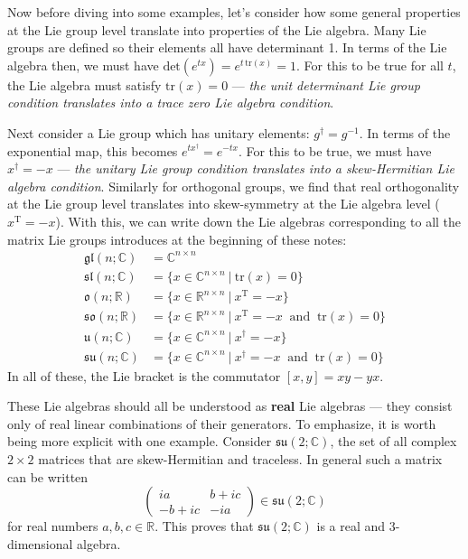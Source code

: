 \documentclass{article}
\renewcommand{\t}[1]{\text{#1}}
\begin{document}
Now before diving into some examples, let's consider how some general properties at the Lie group level translate into properties of the Lie algebra. Many Lie groups are defined so their elements all have determinant 1. In terms of the Lie algebra then, we must have $\t{det}(e^{tx})= e^{t\,\t{tr}(x)}=1$. For this to be true for all $t$, the Lie algebra must satisfy $\t{tr}(x)=0$ --- \emph{the unit determinant Lie group condition translates into a trace zero Lie algebra condition}. 

Next consider a Lie group which has unitary elements: $g^\dagger = g^{-1}$. In terms of the exponential map, this becomes $e^{tx^\dagger}=e^{-tx}$. For this to be true, we must have $x^\dagger = -x$ --- \emph{the unitary Lie group condition translates into a skew-Hermitian Lie algebra condition}. Similarly for orthogonal groups, we find that real orthogonality at the Lie group level translates into skew-symmetry at the Lie algebra level ($x^\t{T}=-x$). With this, we can write down the Lie algebras corresponding to all the matrix Lie groups introduces at the beginning of these notes:
\begin{align*}
	\mathfrak{gl}(n;\mathbb{C}) &= \mathbb{C}^{n\times n} \\
	\mathfrak{sl}(n;\mathbb{C}) &= \{  x\in\mathbb{C}^{n\times n} \:|\: \t{tr}(x)=0\} \\
	\mathfrak{o}(n;\mathbb{R}) &= \{  x\in\mathbb{R}^{n\times n}\:|\: x^\t{T}=-x\} \\
	\mathfrak{so}(n;\mathbb{R}) &= \{  x\in\mathbb{R}^{n\times n}\:|\: x^\t{T}=-x \:\t{ and }\:\t{tr}(x)=0\} \\
	\mathfrak{u}(n;\mathbb{C}) &= \{x\in\mathbb{C}^{n\times n} \:|\: x^\dagger = -x\} \\
	\mathfrak{su}(n;\mathbb{C}) &= \{  x\in\mathbb{C}^{n\times n}\:|\: x^\dagger = -x \:\t{ and }\:\t{tr}(x)=0\}
\end{align*}
In all of these, the Lie bracket is the commutator $[x,y]=xy-yx$.

These Lie algebras should all be understood as \textbf{real} Lie algebras --- they consist only of real linear combinations of their generators. To emphasize, it is worth being more explicit with one example. Consider $\mathfrak{su}(2;\mathbb{C})$, the set of all complex $2\times 2$ matrices that are skew-Hermitian and traceless. In general such a matrix can be written
$$ \begin{pmatrix}
	ia & b + ic \\
	-b+ic & -ia
\end{pmatrix} \in\mathfrak{su}(2;\mathbb{C}) $$
for real numbers $a,b,c\in\mathbb{R}$. This proves that $\mathfrak{su}(2;\mathbb{C})$ is a real and 3-dimensional algebra. 
\end{document}

